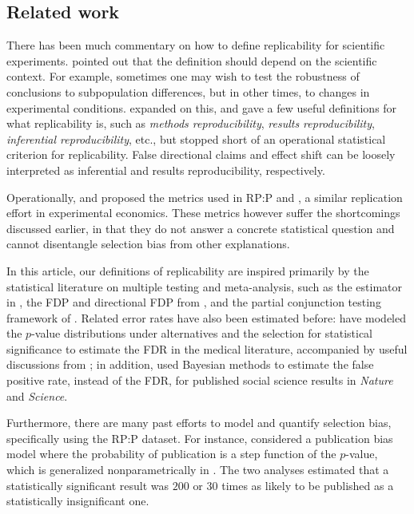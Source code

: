 \documentclass[11pt]{article}
\theoremstyle{definition}
\theoremstyle{custom}
\begin{document}
\subsection{Related work}

  There has been much commentary on how to define replicability for scientific experiments. \citet{Valentine:2011ga} pointed out that the definition should depend on the scientific context. For example, sometimes one may wish to test the robustness of conclusions to subpopulation differences, but in other times, to changes in experimental conditions. \citet{Goodman:2016bo} expanded on this, and gave a few useful definitions for what replicability is, such as {\em methods reproducibility}, {\em results reproducibility}, {\em inferential reproducibility}, etc., but stopped short of an operational statistical criterion for replicability. False directional claims and effect shift can be loosely interpreted as inferential and results reproducibility, respectively.

  Operationally, \citet{Valentine:2011ga} and \citet{Nosek:2017ei} proposed the metrics used in RP:P and \citet{Camerer:2018de}, a similar replication effort in experimental economics. These metrics however suffer the shortcomings discussed earlier, in that they do not answer a concrete statistical question and cannot disentangle selection bias from other explanations.

  In this article, our definitions of replicability are inspired primarily by the statistical literature on multiple testing and meta-analysis, such as the estimator in \citet{Storey:2002vj}, the FDP and directional FDP from \citet{Benjamini:2000ka,Benjamini:2005bv}, and the partial conjunction testing framework of \citet{Heller:2007,Benjamini:2008kj}. Related error rates have also been estimated before: \citet{Jager:2013dq} have modeled the $p$-value distributions under alternatives and the selection for statistical significance to estimate the FDR in the medical literature, accompanied by useful discussions from \citet{Gelman:2013ep,Goodman:2013kj,Ioannidis:2013fz}; in addition, \citet{Camerer:2018de} used Bayesian methods to estimate the false positive rate, instead of the FDR, for published social science results in {\em Nature} and {\em Science}.

  Furthermore, there are many past efforts to model and quantify selection bias, specifically using the RP:P dataset. For instance, \citet{Johnson:2017gu} considered a publication bias model where the probability of publication is a step function of the $p$-value, which is generalized nonparametrically in \citet{Andrews:2018vh}. The two analyses estimated that a statistically significant result was $200$ \citep{Johnson:2017gu} or $30$ \citep{Andrews:2018vh} times as likely to be published as a statistically insignificant one.
\end{document}
